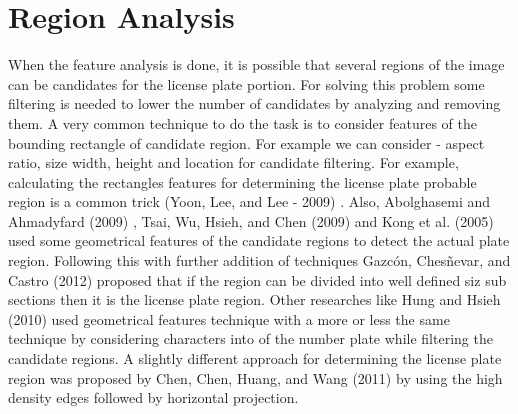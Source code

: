 \section{Region Analysis}

When the feature analysis is done, it is possible that several regions of the image can be candidates for the license plate portion. For solving this problem some filtering is needed to lower the number of candidates by analyzing and removing them. A very common technique to do the task is to consider features of the bounding rectangle of candidate region. For example we can consider - aspect ratio, size width, height and location for candidate filtering. For example, calculating the rectangles features for determining the license plate probable region is a common trick (Yoon,
Lee, and Lee - 2009) \cite{yoon_lee_lee_2009}. Also, Abolghasemi and Ahmadyfard (2009) \cite{abolghasemi_ahmadyfard_2009}, Tsai, Wu,
Hsieh, and Chen (2009) \cite{Tsai2009} and Kong et al. (2005) \cite{Kong2005} used some geometrical features of the candidate
regions to detect the actual plate region. Following this with
further addition of techniques Gazcón, Chesñevar, and Castro (2012) \cite{gazcon2012automatic} proposed that if the region can be divided into well defined siz sub sections then it is the license plate region. Other researches like Hung and Hsieh (2010) \cite{hsieh2009real} used geometrical features technique
with a more or less the same technique by considering characters into
of the number plate while filtering the candidate regions. A slightly different approach for determining the license plate region was proposed by Chen, Chen, Huang, and Wang
(2011) \cite{chen2011license} by using the high density edges followed by horizontal projection.
